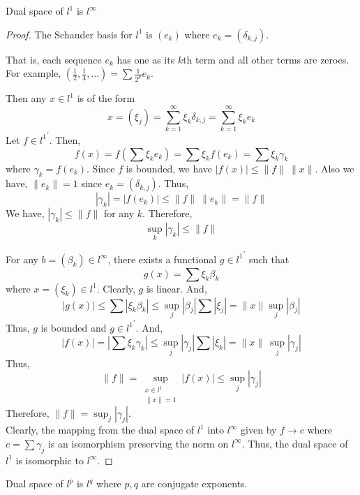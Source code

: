 \begin{important}
\begin{remark}
	Dual space of $l^1$ is $l^\infty$
\end{remark}
\end{important}
\begin{proof}
	The Schauder basis for $l^1$ is $(e_k)$ where $e_k = (\delta_{k,j})$.
	\begin{commentary}
	That is, each sequence $e_k$ has one as its $k$th term and all other terms are zeroes.
	For example, $(\frac{1}{2},\frac{1}{4},\dots) = \sum \frac{1}{2^k} e_k$.
	\end{commentary}	
	Then any $x \in l^1$ is of the form
	\[ x = (\xi_j) = \sum_{k=1}^\infty \xi_k \delta_{k,j} = \sum_{k =1}^\infty \xi_k e_k \]
	Let $f \in {l^1}^\prime$.
	Then,
	\[ f(x) = f\left(\sum \xi_k e_k\right) = \sum \xi_k f(e_k) = \sum \xi_k \gamma_k \]
	where $\gamma_k = f(e_k)$.
	Since $f$ is bounded, we have $|f(x)| \le \|f\| \ \|x\|$.
	Also we have, $\|e_k\| = 1$ since $e_k = (\delta_{k,j})$.
	Thus,
	\[ |\gamma_k| = |f(e_k)| \le \|f\| \ \|e_k\| = \|f\| \]
	We have, $|\gamma_k| \le \|f\|$ for any $k$.
	Therefore,
	\[ \sup_k |\gamma_k| \le \|f\| \]

	For any $b = (\beta_k) \in l^\infty$, there exists a functional $g \in {l^1}^\prime$ such that
	\[ g(x) = \sum \xi_k \beta_k \]
	where $x = (\xi_k) \in l^1$.
	Clearly, $g$ is linear.
	And,
	\[ |g(x)| \le \sum |\xi_k \beta_k| \le \sup_j |\beta_j| \sum |\xi_j| = \|x\| \sup_j |\beta_j| \]
	Thus, $g$ is bounded and $g \in {l^1}^\prime$.
	And,
	\[ |f(x)| = \left| \sum \xi_k \gamma_k \right| \le \sup_j |\gamma_j| \sum |\xi_k| = \|x\| \ \sup_j |\gamma_j| \]
	Thus,
	\[ \|f\| = \sup_{\substack{x \in l^1\\ \|x\| =1 }} |f(x)| \le \sup_j |\gamma_j| \]
	Therefore, $\|f\| = \sup_j |\gamma_j|$.\\

	Clearly, the mapping from the dual space of ${l^1}$ into $l^\infty$ given by $f \to c$ where $c = \sum \gamma_j$ is an isomorphism preserving the norm on $l^\infty$.
	Thus, the dual space of $l^1$ is isomorphic to $l^\infty$.
\end{proof}
\begin{important}
\begin{remark}
	Dual space of $l^p$ is $l^q$ where $p,q$ are conjugate exponents.
\end{remark}
\end{important}

